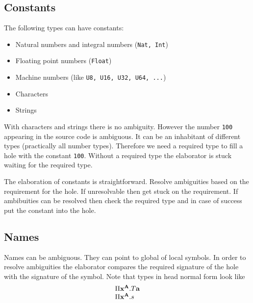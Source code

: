 \subsection{Constants}

The following types can have constants:
\begin{itemize}
    \item Natural numbers and integral numbers ({\tt Nat, Int})
    \item Floating point numbers ({\tt Float})
    \item Machine numbers (like {\tt U8, U16, U32, U64, ...})
    \item Characters
    \item Strings
\end{itemize}

With characters and strings there is no ambiguity. However the number {\tt 100}
appearing in the source code is ambiguous. It can be an inhabitant of different
types (practically all number types). Therefore we need a required type to fill
a hole with the constant {\tt 100}. Without a required type the elaborator is
stuck waiting for the required type.

The elaboration of constants is straightforward. Resolve ambiguities based on
the requirement for the hole. If unresolvable then get stuck on the requirement.
If ambibuities can be resolved then check the required type and in case of
success put the constant into the hole.








\subsection{Names}

Names can be ambiguous. They can point to global of local symbols. In
order to resolve ambiguities the elaborator compares the required signature of
the hole with the signature of the symbol. Note that types in head normal form
look like
$$
\begin{array}{l}
    \Pi {{\mathbf x}^{{\mathbf A}}}. T {\mathbf a}
    \\
    \Pi {{\mathbf x}^{{\mathbf A}}}. s
\end{array}
$$

